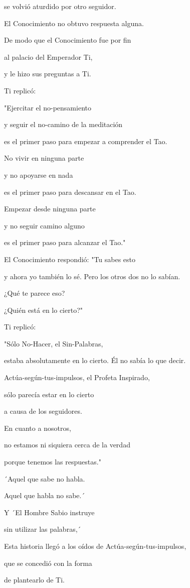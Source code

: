 se volvió aturdido por otro seguidor.

El Conocimiento no obtuvo respuesta alguna.

De modo que el Conocimiento fue por fin

al palacio del Emperador Ti,

y le hizo sus preguntas a Ti.

Ti replicó:

"Ejercitar el no-pensamiento

y seguir el no-camino de la meditación

es el primer paso para empezar a comprender el Tao.

No vivir en ninguna parte

y no apoyarse en nada

es el primer paso para descansar en el Tao.

Empezar desde ninguna parte

y no seguir camino alguno

es el primer paso para alcanzar el Tao."

El Conocimiento respondió: "Tu sabes esto

y ahora yo también lo sé. Pero los otros dos no lo sabían.

¿Qué te parece eso?

¿Quién está en lo cierto?"

Ti replicó:

"Sólo No-Hacer, el Sin-Palabras,

estaba absolutamente en lo cierto. Él no sabía lo que decir.

Actúa-según-tus-impulsos, el Profeta Inspirado,

sólo parecía estar en lo cierto

a causa de los seguidores.

En cuanto a nosotros,

no estamos ni siquiera cerca de la verdad

porque tenemos las respuestas."

´Aquel que sabe no habla.

Aquel que habla no sabe.´

Y ´El Hombre Sabio instruye

sin utilizar las palabras,´

Esta historia llegó a los oídos de Actúa-según-tus-impulsos,

que se concedió con la forma

de plantearlo de Ti.

